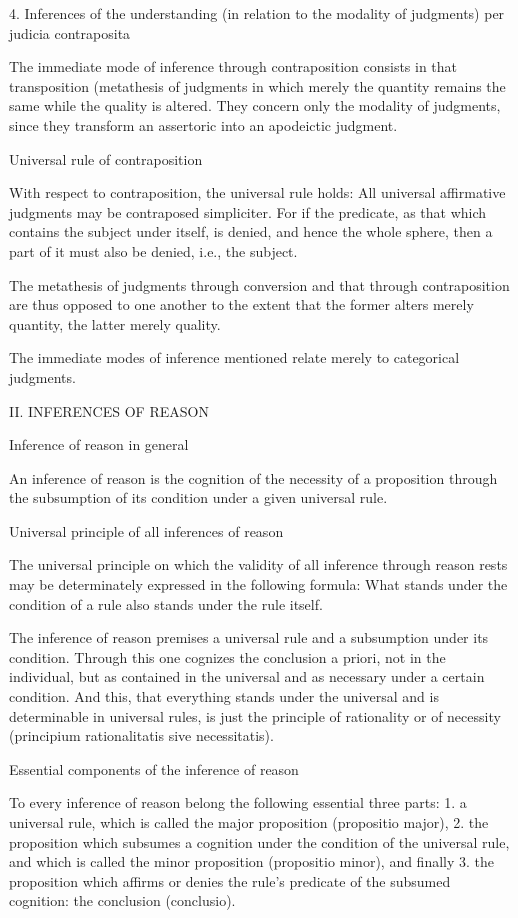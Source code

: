 4. Inferences of the understanding
(in relation to the modality of judgments)
per judicia contraposita

The immediate mode of inference through contraposition consists in that
transposition (metathesis of judgments in which
merely the quantity remains the same while the quality is altered.
They concern only the modality of judgments,
since they transform an assertoric into an apodeictic judgment.

Universal rule of contraposition

With respect to contraposition, the universal rule holds:
All universal affirmative judgments may be contraposed simpliciter.
For if the predicate, as that which contains the subject under itself, is denied,
and hence the whole sphere, then a part of it must also be denied, i.e., the
subject.

    The metathesis of judgments through conversion and that
    through contraposition are thus opposed to one another to the extent that
    the former alters merely quantity, the latter merely quality.

    The immediate modes of inference mentioned relate merely to
    categorical judgments.

II. INFERENCES OF REASON

Inference of reason in general

An inference of reason is the cognition of the necessity of a proposition
through the subsumption of its condition under a given universal rule.

Universal principle of all inferences of reason

The universal principle on which the validity of
all inference through reason rests may be
determinately expressed in the following formula:
What stands under the condition of a rule
also stands under the rule itself.

    The inference of reason premises a universal rule and
    a subsumption under its condition.
    Through this one cognizes the conclusion a priori,
    not in the individual, but as contained in the universal and
    as necessary under a certain condition.
    And this, that everything stands under the universal and
    is determinable in universal rules, is just
    the principle of rationality or of necessity
    (principium rationalitatis sive necessitatis).

Essential components of the inference of reason

To every inference of reason belong the following essential three parts:
1. a universal rule, which is called the major proposition (propositio major),
2. the proposition which subsumes a cognition under the condition of
the universal rule, and which is called the minor proposition (propositio minor), and finally
3. the proposition which affirms or denies the rule's predicate of the subsumed cognition:
the conclusion (conclusio).

